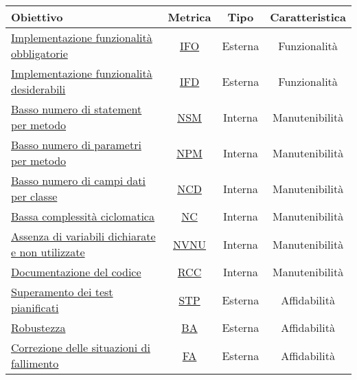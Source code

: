 		\begin{table}[H]
		\centering
		\small
		\begin{tabular}{l | c| c| c}
			\hline
			\textbf{Obiettivo}                         & \textbf{Metrica} & \textbf{Tipo} & \textbf{Caratteristica} \\ \hline
			\hyperref[OIDFO]{Implementazione  funzionalità obbligatorie} 						& \hyperref[MIDFO]{IFO}              & Esterna       & Funzionalità            \\
			\hyperref[OIDFD]{Implementazione funzionalità desiderabili}                         & \hyperref[MIDFD]{IFD}              & Esterna       & Funzionalità            \\
			\hyperref[OBNDSPM]{Basso numero di statement per metodo}                                   & \hyperref[MBNDSPM]{NSM}              & Interna       & Manutenibilità          \\
			\hyperref[OBNDPPM]{Basso numero di parametri per metodo}                                    & \hyperref[MBNDPPM]{NPM}              & Interna       & Manutenibilità          \\
			\hyperref[OBNDCDPC]{Basso numero di campi dati per classe}                                   	& \hyperref[MBNDCDPC]{NCD}              & Interna       & Manutenibilità          \\
			\hyperref[OBCC]{Bassa complessità ciclomatica}                                                   & \hyperref[MBCC]{NC}               & Interna       & Manutenibilità          \\
			\hyperref[OADVDENU]{Assenza di variabili dichiarate e non utilizzate}                                   & \hyperref[MADVDENU]{NVNU}             & Interna       & Manutenibilità          \\
			\hyperref[ODDC]{Documentazione del codice}                                             & \hyperref[MDDC]{RCC}              & Interna       & Manutenibilità          \\
			\hyperref[OSDTP]{Superamento dei test pianificati}                                              & \hyperref[MSDTR]{STP}              & Esterna       & Affidabilità            \\
			\hyperref[OR]{Robustezza}                                                                     & \hyperref[MR]{BA}               & Esterna       & Affidabilità            \\
			\hyperref[OCDSDF]{Correzione delle situazioni di fallimento}                           & \hyperref[MCDSDF]{FA}               & Esterna       & Affidabilità            \\

\end{tabular}
\end{table}
